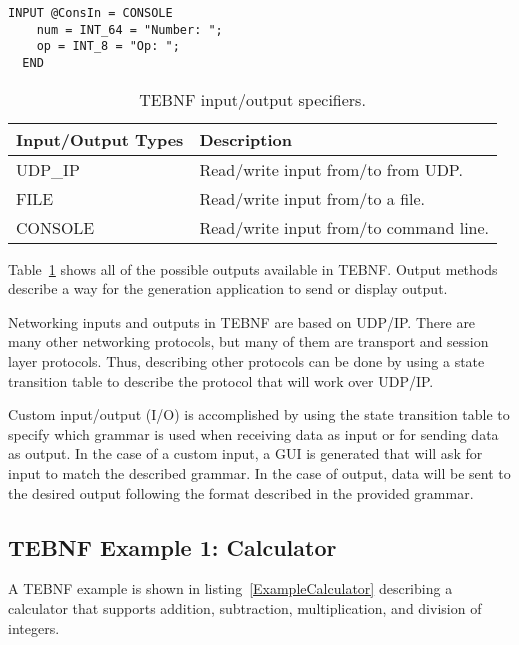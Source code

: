 \begin{lstlisting}[basicstyle=\small,caption={A TEBNF Console Input element.},label=ExampleInputElement]
  INPUT @ConsIn = CONSOLE
    num = INT_64 = "Number: ";
    op = INT_8 = "Op: ";
  END
\end{lstlisting}

\begin{table}[h]
\begin{center}
\caption{TEBNF input/output specifiers.}
\label{TEBNFInputAndOutputSpecifiers}
\begin{tabular}{|l|l|} \hline
\textbf{Input/Output Types} & \textbf{Description} \\ \hline \hline
UDP\_IP	& Read/write input from/to from UDP. \\ \hline
FILE	& Read/write input from/to a file. \\ \hline
CONSOLE	& Read/write input from/to command line. \\ \hline
\end{tabular}
\end{center}
\end{table}

\indent
Table~\ref{TEBNFInputAndOutputSpecifiers} shows all of the possible outputs available in TEBNF.  Output methods describe a way for the generation application to send or display output.
 
\indent
Networking inputs and outputs in TEBNF are based on UDP/IP.  There are many other networking protocols, but many of them are transport and session layer protocols.  Thus, describing other protocols can be done by using a state transition table to describe the protocol that will work over UDP/IP.

\indent
Custom input/output (I/O) is accomplished by using the state transition table to specify which grammar is used when receiving data as input or for sending data as output.  In the case of a custom input, a GUI is generated that will ask for input to match the described grammar.  In the case of output, data will be sent to the desired output following the format described in the provided grammar.

\subsection{TEBNF Example 1: Calculator}
A TEBNF example is shown in listing~\ref{ExampleCalculator} describing a calculator that supports addition, subtraction, multiplication, and division of integers.

